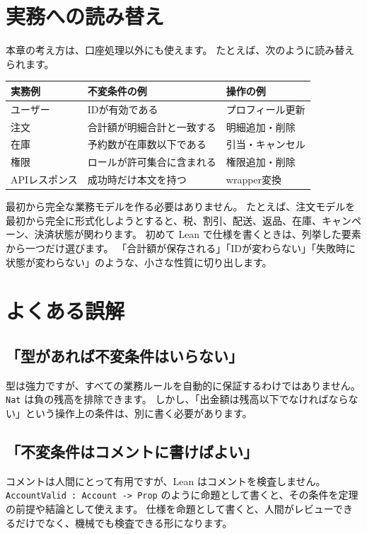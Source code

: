 \section{実務への読み替え}

本章の考え方は、口座処理以外にも使えます。
たとえば、次のように読み替えられます。

\begin{center}
\begin{tabular}{lll}
\toprule
実務例 & 不変条件の例 & 操作の例 \\
\midrule
ユーザー & IDが有効である & プロフィール更新 \\
注文 & 合計額が明細合計と一致する & 明細追加・削除 \\
在庫 & 予約数が在庫数以下である & 引当・キャンセル \\
権限 & ロールが許可集合に含まれる & 権限追加・削除 \\
APIレスポンス & 成功時だけ本文を持つ & wrapper変換 \\
\bottomrule
\end{tabular}
\end{center}

最初から完全な業務モデルを作る必要はありません。
たとえば、注文モデルを最初から完全に形式化しようとすると、税、割引、配送、返品、在庫、キャンペーン、決済状態が関わります。
初めて Lean で仕様を書くときは、列挙した要素から一つだけ選びます。
「合計額が保存される」「IDが変わらない」「失敗時に状態が変わらない」のような、小さな性質に切り出します。

\section{よくある誤解}

\subsection{「型があれば不変条件はいらない」}

型は強力ですが、すべての業務ルールを自動的に保証するわけではありません。
\texttt{Nat} は負の残高を排除できます。
しかし、「出金額は残高以下でなければならない」という操作上の条件は、別に書く必要があります。

\subsection{「不変条件はコメントに書けばよい」}

コメントは人間にとって有用ですが、Lean はコメントを検査しません。
\texttt{AccountValid : Account -> Prop} のように命題として書くと、その条件を定理の前提や結論として使えます。
仕様を命題として書くと、人間がレビューできるだけでなく、機械でも検査できる形になります。

